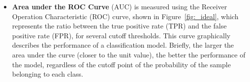 \documentclass{ieeeaccess}
\begin{document}

\begin{itemize}
    \item \textbf{Area under the ROC Curve} (AUC) is measured using the Receiver Operation Characteristic (ROC) curve, shown in Figure~\ref{fig:_ideal}, which represents the ratio between the true positive rate (TPR) and the false positive rate (FPR), for several cutoff thresholds. This curve graphically describes the performance of a classification model. Briefly, the larger the area under the curve (closer to the unit value), the better the performance of the model, regardless of the cutoff point of the probability of the sample belonging to each class.
\end{itemize}
\end{document}
